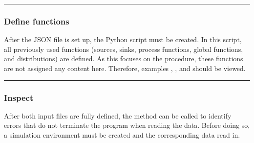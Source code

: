 \documentclass[letterpaper,10pt,english]{sphinxmanual}
\begin{document}
\begin{sphinxVerbatim}[commandchars=\\\{\}]
    
       \PYG{p}{[}\PYG{p}{],}
       \PYG{p}{[}\PYG{p}{],}
       \PYG{p}{[}\PYG{p}{]}
\end{sphinxVerbatim}


\bigskip\hrule\bigskip



\subsubsection{Define functions}
\label{\detokenize{source/Examples/example01:define-functions}}\label{\detokenize{source/Examples/example01:id4}}
\sphinxAtStartPar
After the JSON file is set up, the Python script must be created. In this script, all previously used functions
(sources, sinks, process functions, global functions, and distributions) are defined. As this focuses on the procedure,
these functions are not assigned any content here. Therefore, examples  {\hyperref[\detokenize{source/Examples/example02:id1}]{}},
{\hyperref[\detokenize{source/Examples/example03:id1}]{}}, and {\hyperref[\detokenize{source/Examples/example04:id1}]{}} should be viewed.


\bigskip\hrule\bigskip



\subsubsection{Inspect}
\label{\detokenize{source/Examples/example01:inspect}}\label{\detokenize{source/Examples/example01:id5}}
\sphinxAtStartPar
After both input files are fully defined, the  method can be called to identify errors that do not
terminate the program when reading the data. Before doing so, a simulation environment must be created and the
corresponding data read in.
\end{document}
